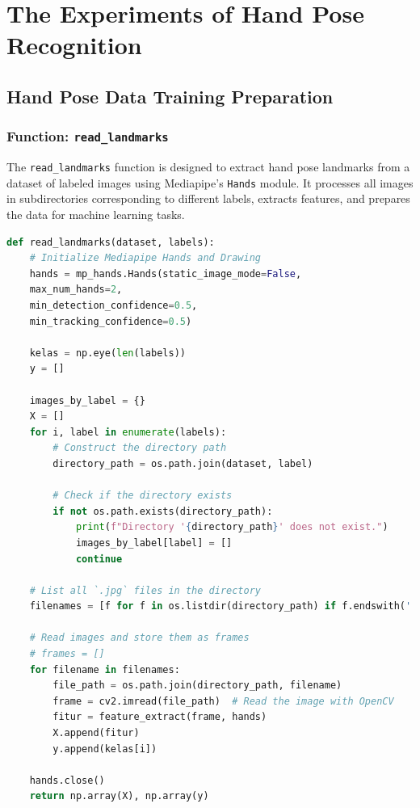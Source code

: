 
\chapter{The Experiments of Hand Pose Recognition}

\section{Hand Pose Data Training Preparation}
\subsection*{Function: \texttt{read\_landmarks}}

The \texttt{read\_landmarks} function is designed to extract hand pose landmarks from a dataset of labeled images using Mediapipe's \texttt{Hands} module. It processes all images in subdirectories corresponding to different labels, extracts features, and prepares the data for machine learning tasks.

\begin{lstlisting}[language=Python, caption=The \texttt{read\_landmarks} function]
def read_landmarks(dataset, labels):
	# Initialize Mediapipe Hands and Drawing
	hands = mp_hands.Hands(static_image_mode=False,
	max_num_hands=2,
	min_detection_confidence=0.5,
	min_tracking_confidence=0.5)
	
	kelas = np.eye(len(labels))
	y = []
	
	images_by_label = {}
	X = []
	for i, label in enumerate(labels):
		# Construct the directory path
		directory_path = os.path.join(dataset, label)
	
		# Check if the directory exists
		if not os.path.exists(directory_path):
			print(f"Directory '{directory_path}' does not exist.")
			images_by_label[label] = []
			continue
	
	# List all `.jpg` files in the directory
	filenames = [f for f in os.listdir(directory_path) if f.endswith('.jpg')]
	
	# Read images and store them as frames
	# frames = []
	for filename in filenames:
		file_path = os.path.join(directory_path, filename)
		frame = cv2.imread(file_path)  # Read the image with OpenCV
		fitur = feature_extract(frame, hands)
		X.append(fitur)
		y.append(kelas[i])
	
	hands.close()
	return np.array(X), np.array(y)
\end{lstlisting}

